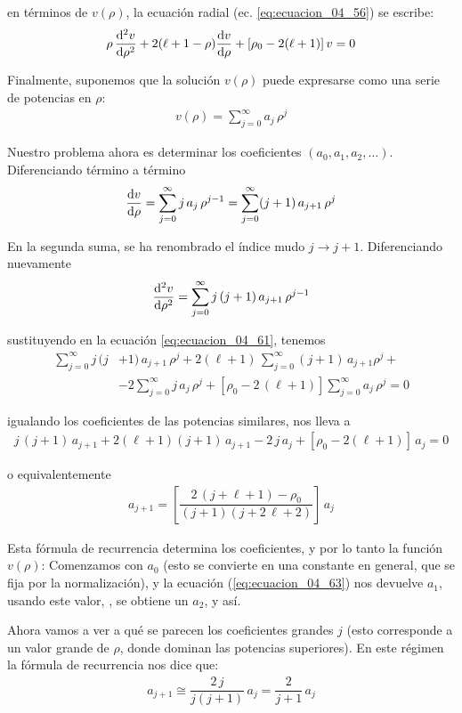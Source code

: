 en términos de $v(\rho)$, la  ecuación radial (ec. \ref{eq:ecuacion_04_56}) se escribe:
\begin{align}
\rho \, \dv[2]{v}{\rho} + 2 (\ell + 1 - \rho) \dv{v}{\rho} + [\rho_{0} - 2 (\ell + 1)] \, v = 0
\label{eq:ecuacion_04_61}
\end{align}

Finalmente, suponemos que la solución $v(\rho)$ puede expresarse como una serie de potencias en $\rho$:
\begin{align}
v(\rho) = \sum_{j=0}^{\infty} a_{j} \, \rho^{j} 
\label{eq:ecuacion_04_62}
\end{align}

Nuestro problema ahora es determinar los coeficientes $(a_{0}, a_{1}, a_{2}, \ldots)$. Diferenciando término a término
\begin{align*}
\dv{v}{\rho} = \sum_{j=0}^{\infty} j \, a_{j} \, \rho^{j - 1} = \sum_{j=0}^{\infty} (j + 1) \, a_{j+1} \, \rho^{j}
\end{align*}

En la segunda suma, se ha renombrado el índice mudo $j \to j + 1$. Diferenciando nuevamente
\begin{align*}
\dv[2]{v}{\rho} = \sum_{j=0}^{\infty} j \, (j+1) \, a_{j+1} \, \rho^{j-1}
\end{align*}

sustituyendo en la ecuación \ref{eq:ecuacion_04_61}, tenemos
\begin{align*}
\sum_{j=0}^{\infty} j \, (j &+ 1) \, a_{j+1} \, \rho^{j} + 2 (\ell + 1) \, \sum_{j=0}^{\infty} (j + 1) \, a_{j+1} \rho^{j} + \\[0.5em]
&- 2 \sum_{j=0}^{\infty} j \, a_{j} \, \rho^{j} + [ \rho_{0} - 2 \, (\ell + 1)] \sum_{j=0}^{\infty} a_{j} \, \rho^{j} = 0
\end{align*}

igualando los coeficientes de las potencias similares, nos lleva a
\begin{align*}
j \, (j + 1) \, a_{j+1} + 2(\ell + 1)(j + 1) \, a_{j+1} - 2 \, j \, a_{j} + [\rho_{0} - 2(\ell + 1)] \, a_{j} = 0
\end{align*}

o equivalentemente
\begin{align}
a_{j+1} = \left[ \dfrac{2 \, (j + \ell + 1) - \rho_{0}}{(j + 1)(j + 2 \, \ell + 2)} \right] \, a_{j}
\label{eq:ecuacion_04_63}
\end{align}

Esta fórmula de recurrencia determina los coeficientes, y por lo tanto la función $v(\rho)$: Comenzamos con $a_{0}$ (esto se convierte en una constante en general, que se fija por la normalización), y la ecuación (\ref{eq:ecuacion_04_63}) nos devuelve $a_{1}$, usando este valor, , se obtiene un $a_{2}$, y así.
\par
Ahora vamos a ver a qué se parecen los coeficientes grandes $j$ (esto corresponde a un valor grande de $\rho$, donde dominan las potencias superiores). En este régimen la fórmula de recurrencia nos dice que:
\begin{align*}
a_{j+1} \cong \dfrac{2 \, j}{j (j + 1)} \, a_{j} =  \dfrac{2}{j + 1} \, a_{j}
\end{align*}

